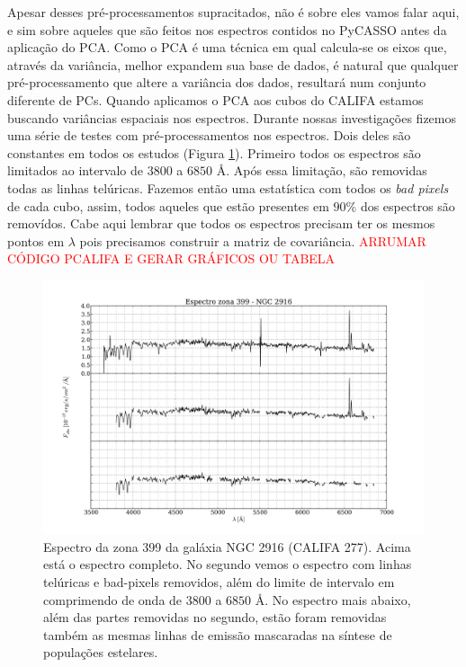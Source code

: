 Apesar desses pré-processamentos supracitados, não é sobre eles vamos falar aqui, e sim sobre aqueles que são feitos nos
espectros contidos no PyCASSO antes da aplicação do PCA. Como o PCA é uma técnica em qual calcula-se os eixos que,
através da variância, melhor expandem sua base de dados, é natural que qualquer pré-processamento que altere a variância
dos dados, resultará num conjunto diferente de PCs. Quando aplicamos o PCA aos cubos do CALIFA estamos buscando
variâncias espaciais nos espectros. Durante nossas investigações fizemos uma série de testes com pré-processamentos nos
espectros. Dois deles são constantes em todos os estudos (Figura \ref{fig:UsoPCA:checkmask}). Primeiro todos os
espectros são limitados ao intervalo de $3800$ a $6850$ \AA. Após essa limitação, são removidas todas as linhas
telúricas. Fazemos então uma estatística com todos os {\em bad pixels} de cada cubo, assim, todos aqueles que estão
presentes em $90\%$ dos espectros são removídos. Cabe aqui lembrar que todos os espectros precisam ter os mesmos pontos
em $\lambda$ pois precisamos construir a matriz de covariância. \fixme\textcolor{red}{ARRUMAR CÓDIGO PCALIFA E GERAR
GRÁFICOS OU TABELA}

\begin{figure}
    \includegraphics[width=1.0\textwidth]{figuras/K0277-constant_inital_mask-399.pdf}
    \caption[Exemplo de máscaras em um espectro do cubo de dados.]
    {Espectro da zona 399 da galáxia NGC 2916 (CALIFA 277). Acima está o espectro completo. No segundo vemos o espectro
    com linhas telúricas e bad-pixels removidos, além do limite de intervalo em comprimendo de onda de $3800$ a $6850$
    \AA. No espectro mais abaixo, além das partes removidas no segundo, estão foram removidas também as mesmas linhas de
    emissão mascaradas na síntese de populações estelares.}
    \label{fig:UsoPCA:checkmask}
\end{figure}

